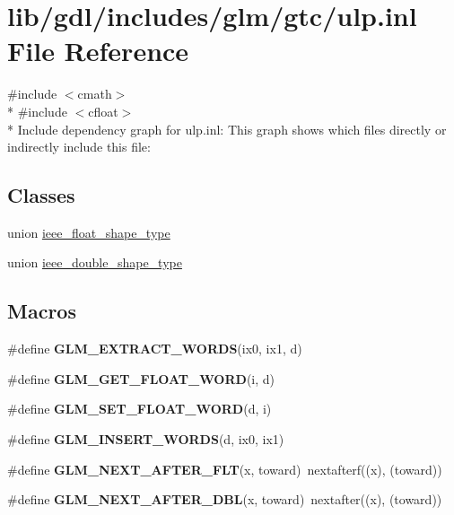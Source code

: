 \hypertarget{ulp_8inl}{}\section{lib/gdl/includes/glm/gtc/ulp.inl File Reference}
\label{ulp_8inl}
{\ttfamily \#include $<$cmath$>$}\\*
{\ttfamily \#include $<$cfloat$>$}\\*
Include dependency graph for ulp.\+inl\+:
This graph shows which files directly or indirectly include this file\+:
\subsection*{Classes}
\begin{DoxyCompactItemize}
\item 
union \hyperlink{unionieee__float__shape__type}{ieee\+\_\+float\+\_\+shape\+\_\+type}
\item 
union \hyperlink{unionieee__double__shape__type}{ieee\+\_\+double\+\_\+shape\+\_\+type}
\end{DoxyCompactItemize}
\subsection*{Macros}
\begin{DoxyCompactItemize}
\item 
\#define {\bfseries G\+L\+M\+\_\+\+E\+X\+T\+R\+A\+C\+T\+\_\+\+W\+O\+R\+D\+S}(ix0,  ix1,  d)
\item 
\#define {\bfseries G\+L\+M\+\_\+\+G\+E\+T\+\_\+\+F\+L\+O\+A\+T\+\_\+\+W\+O\+R\+D}(i,  d)
\item 
\#define {\bfseries G\+L\+M\+\_\+\+S\+E\+T\+\_\+\+F\+L\+O\+A\+T\+\_\+\+W\+O\+R\+D}(d,  i)
\item 
\#define {\bfseries G\+L\+M\+\_\+\+I\+N\+S\+E\+R\+T\+\_\+\+W\+O\+R\+D\+S}(d,  ix0,  ix1)
\item 
\hypertarget{ulp_8inl_a37306c8581ba58873df0e36d3a253cec}{}\#define {\bfseries G\+L\+M\+\_\+\+N\+E\+X\+T\+\_\+\+A\+F\+T\+E\+R\+\_\+\+F\+L\+T}(x,  toward)~nextafterf((x), (toward))\label{ulp_8inl_a37306c8581ba58873df0e36d3a253cec}

\item 
\hypertarget{ulp_8inl_a4f17b207ed3eb0c72bdeffb6eb013e90}{}\#define {\bfseries G\+L\+M\+\_\+\+N\+E\+X\+T\+\_\+\+A\+F\+T\+E\+R\+\_\+\+D\+B\+L}(x,  toward)~nextafter((x), (toward))\label{ulp_8inl_a4f17b207ed3eb0c72bdeffb6eb013e90}

\end{DoxyCompactItemize}
